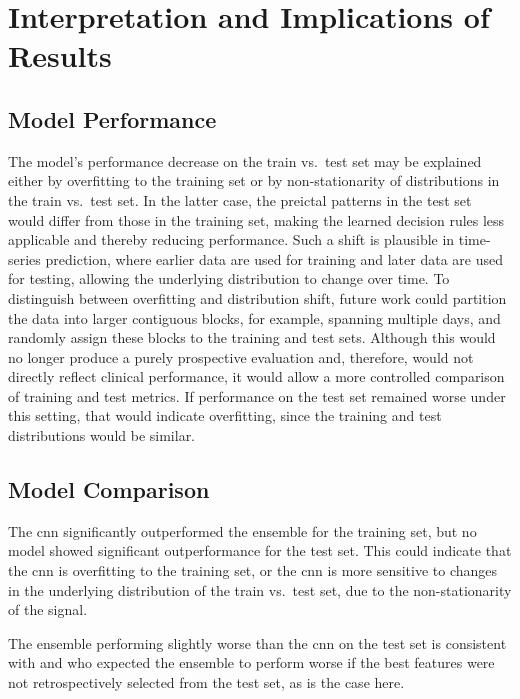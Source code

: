 \section{Interpretation and Implications of Results}\label{sec:interpretation-and-implications-of-results}

\subsection{Model Performance}\label{subsec:discussion-model-performance}
The model's performance decrease on the train vs.\ test set may be explained either by overfitting to the training set or by non-stationarity of distributions in the train vs.\ test set.
In the latter case, the preictal patterns in the test set would differ from those in the training set, making the learned decision rules less applicable and thereby reducing performance.
Such a shift is plausible in time-series prediction, where earlier data are used for training and later data are used for testing, allowing the underlying distribution to change over time.
To distinguish between overfitting and distribution shift, future work could partition the data into larger contiguous blocks, for example, spanning multiple days, and randomly assign these blocks to the training and test sets.
Although this would no longer produce a purely prospective evaluation and, therefore, would not directly reflect clinical performance, it would allow a more controlled comparison of training and test metrics.
If performance on the test set remained worse under this setting, that would indicate overfitting, since the training and test distributions would be similar.


\subsection{Model Comparison}\label{subsec:discussion-model-comparison}
The \gls{cnn} significantly outperformed the ensemble for the training set, but no model showed significant outperformance for the test set.
This could indicate that the \gls{cnn} is overfitting to the training set, or the \gls{cnn} is more sensitive to changes in the underlying distribution of the train vs.\ test set, due to the non-stationarity of the signal.

The ensemble performing slightly worse than the \gls{cnn} on the test set is consistent with \textcite{eberlein_evaluation_2019} and \textcite{muller_coherent_2022} who expected the ensemble to perform worse if the best features were not retrospectively selected from the test set, as is the case here.

